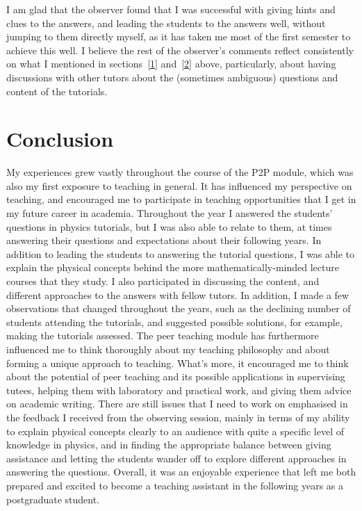 \documentclass[12pt,avenir,a4paper,final]{iopart}
\begin{document}
\indent \par{} I am glad that the observer found that I was successful with giving hints and clues to the answers, and leading the students to the answers well, without jumping to them directly myself, as it has taken me most of the first semester to achieve this well. I believe the rest of the observer's comments reflect consistently on what I mentioned in sections~\ref{1} and~\ref{2} above, particularly, about having discussions with other tutors about the (sometimes ambiguous) questions and content of the tutorials.
\section{Conclusion}
\indent \par{} My experiences grew vastly throughout the course of the P2P module, which was also my first exposure to teaching in general. It has influenced my perspective on teaching, and encouraged me to participate in  teaching opportunities that I get in my future career in academia. Throughout the year I answered the students' questions in physics tutorials, but I was also able to relate to them, at times answering their questions and expectations about their following years. In addition to leading the students to answering the tutorial questions, I was able to explain the physical concepts behind the more mathematically-minded lecture courses that they study. I also participated in discussing the content, and different approaches to the answers with fellow tutors. In addition, I made a few observations that changed throughout the years, such as the declining number of students attending the tutorials, and suggested possible solutions, for example, making the tutorials assessed. The peer teaching module has furthermore influenced me to think thoroughly about my teaching philosophy and about forming a unique approach to teaching. What's more, it  encouraged me to think about the potential of peer teaching and its possible applications in supervising tutees, helping them with laboratory and practical work, and giving them advice on academic writing. There are still issues that I need to work on emphasised in the feedback I received from the observing session, mainly in terms of my ability to explain physical concepts clearly to an audience with quite a specific level of knowledge in physics, and in finding the appropriate balance between giving assistance and letting the students wander off to explore different approaches in answering the questions. Overall, it was an enjoyable experience that left me both prepared and excited to become a teaching assistant in the following years as a postgraduate student. 
\indent \par{} 
\clearpage
\end{document}
